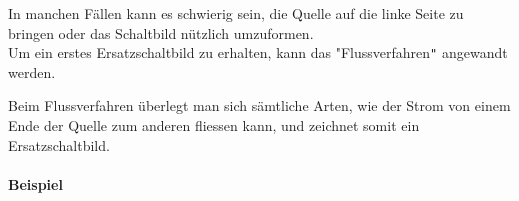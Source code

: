 										\iend

										In manchen Fällen kann es schwierig sein, die Quelle auf die linke Seite zu bringen oder das Schaltbild nützlich umzuformen. \\
										Um ein erstes Ersatzschaltbild zu erhalten, kann das "Flussverfahren\texttt{"} angewandt werden.

					\newpage
										\beginbsp
										Beim Flussverfahren überlegt man sich sämtliche Arten, wie der Strom von einem Ende der Quelle zum anderen fliessen kann, und zeichnet somit ein Ersatzschaltbild. \\ \\
										\textbf{Beispiel}
										\begin{center}
											\fix
										\end{center}
										\iend

